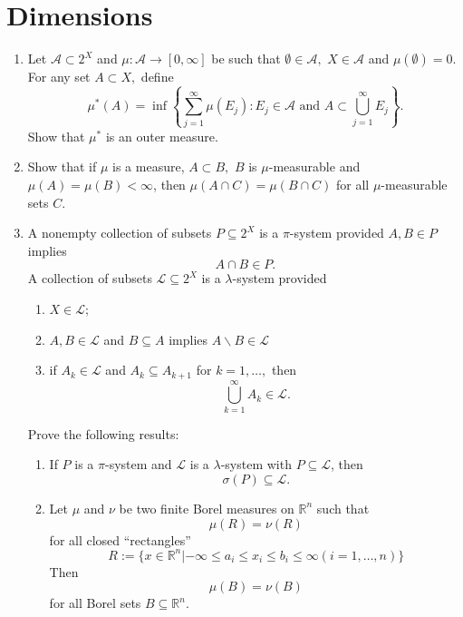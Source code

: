 
\section{Dimensions}

\begin{enumerate}
    \item Let $\mathcal{A}\subset2^{X}$ and $\mu:\mathcal{A}\rightarrow[0,\infty]$ be such that $\emptyset\in\mathcal{A},$ $X\in\mathcal{A}$ and $\mu(\emptyset)=0$. For any set $A\subset X,$ define
    $$\mu^{*}(A)=\inf\left\{\sum_{j=1}^{\infty}\mu(E_{j}):E_{j}\in\mathcal{A}\text{ and }A\subset\bigcup_{j=1}^{\infty}E_{j}\right\}.$$
    Show that $\mu^{*}$ is an outer measure.
    \item Show that if $\mu$ is a measure, $A\subset B,$ $B$ is $\mu$-measurable and $\mu(A)=\mu(B)<\infty$, then $\mu(A\cap C)=\mu(B\cap C)$ for all $\mu$-measurable sets $C$.
    \item A nonempty collection of subsets $P\subseteq2^{X}$ is a $\pi$-system provided $A,B\in P$ implies
    $$A\cap B\in P.$$
    A collection of subsets $\mathcal{L}\subseteq2^{X}$ is a $\lambda$-system provided
    \begin{enumerate}
        \item[(i)] $X\in\mathcal{L};$
        \item[(ii)] $A,B\in\mathcal{L}$ and $B\subseteq A$ implies $A\backslash B\in\mathcal{L}$
        \item[(iii)] if $A_{k}\in\mathcal{L}$ and $A_{k}\subseteq A_{k+1}$ for $k=1,\dots,$ then
        $$\bigcup_{k=1}^{\infty}A_{k}\in\mathcal{L}.$$
    \end{enumerate}
    Prove the following results:
    \begin{enumerate}
    \item[(i)] If $P$ is a $\pi$-system and $\mathcal{L}$ is a $\lambda$-system with $P\subseteq\mathcal{L}$, then
    $$\sigma(P)\subseteq\mathcal{L}.$$
    \item[(ii)] Let $\mu$ and $\nu$ be two finite Borel measures on $\mathbb{R}^{n}$ such that
    $$\mu(R)=\nu(R)$$
    for all closed ``rectangles''
    $$R:=\{x\in\mathbb{R}^{n}|-\infty\le a_{i}\le x_{i}\le b_{i}\le\infty(i=1,\dots,n)\}$$
    Then
    $$\mu(B)=\nu(B)$$
    for all Borel sets $B\subseteq\mathbb{R}^{n}$.
\end{enumerate}
\end{enumerate}

